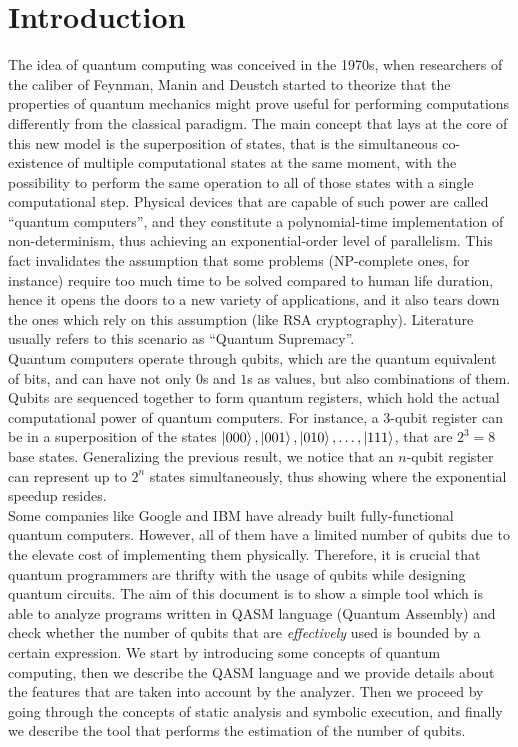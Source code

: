 \documentclass[12pt,a4paper]{report}
\theoremstyle{definition}
\theoremstyle{definition}
\theoremstyle{definition}
\begin{document}
\chapter{Introduction}
The idea of quantum computing was conceived in the 1970s, when researchers of the caliber of Feynman, Manin and Deustch started to theorize that the properties of quantum mechanics might prove useful for performing computations differently from the classical paradigm. The main concept that lays at the core of this new model is the superposition of states, that is the simultaneous co-existence of multiple computational states at the same moment, with the possibility to perform the same operation to all of those states with a single computational step. Physical devices that are capable of such power are called ``quantum computers'', and they constitute a polynomial-time implementation of non-determinism, thus achieving an exponential-order level of parallelism. This fact invalidates the assumption that some problems (NP-complete ones, for instance) require too much time to be solved compared to human life duration, hence it opens the doors to a new variety of applications, and it also tears down the ones which rely on this assumption (like RSA cryptography). Literature usually refers to this scenario as ``Quantum Supremacy''.\\
Quantum computers operate through qubits, which are the quantum equivalent of bits, and can have not only $0$s and $1$s as values, but also combinations of them. Qubits are sequenced together to form quantum registers, which hold the actual computational power of quantum computers. For instance, a 3-qubit register can be in a superposition of the states $\ket{000}, \ket{001}, \ket{010}, \ldots, \ket{111}$, that are $2^3=8$ base states. Generalizing the previous result, we notice that an $n$-qubit register can represent up to $2^n$ states simultaneously, thus showing where the exponential speedup resides.\\
Some companies like Google and IBM have already built fully-functional quantum computers. However, all of them have a limited number of qubits due to the elevate cost of implementing them physically. Therefore, it is crucial that quantum programmers are thrifty with the usage of qubits while designing quantum circuits. The aim of this document is to show a simple tool which is able to analyze programs written in QASM language (Quantum Assembly) and check whether the number of qubits that are \textit{effectively} used is bounded by a certain expression.
We start by introducing some concepts of quantum computing, then we describe the QASM language and we provide details about the features that are taken into account by the analyzer. Then we proceed by going through the concepts of static analysis and symbolic execution, and finally we describe the tool that performs the estimation of the number of qubits.\\
\end{document}
